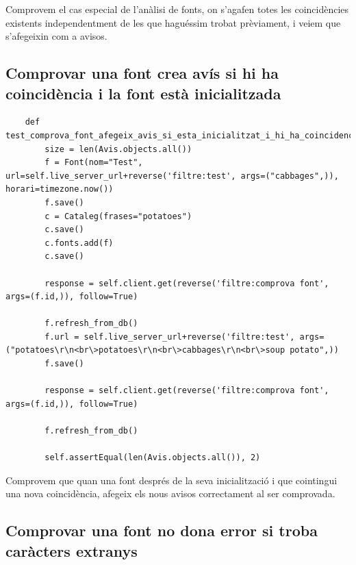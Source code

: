 \documentclass{article}
\begin{document}
Comprovem el cas especial de l'anàlisi de fonts, on s'agafen totes les coincidències existents independentment de les que haguéssim trobat prèviament, i veiem que s'afegeixin com a avisos.

\subsection{Comprovar una font crea avís si hi ha coincidència i la font està inicialitzada}

\begin{lstlisting}
    def test_comprova_font_afegeix_avis_si_esta_inicialitzat_i_hi_ha_coincidencia(self):
        size = len(Avis.objects.all())
        f = Font(nom="Test", url=self.live_server_url+reverse('filtre:test', args=("cabbages",)), horari=timezone.now())
        f.save()
        c = Cataleg(frases="potatoes")
        c.save()
        c.fonts.add(f)
        c.save()

        response = self.client.get(reverse('filtre:comprova font', args=(f.id,)), follow=True)

        f.refresh_from_db()
        f.url = self.live_server_url+reverse('filtre:test', args=("potatoes\r\n<br\>potatoes\r\n<br\>cabbages\r\n<br\>soup potato",))
        f.save()

        response = self.client.get(reverse('filtre:comprova font', args=(f.id,)), follow=True)

        f.refresh_from_db()

        self.assertEqual(len(Avis.objects.all()), 2)
\end{lstlisting}

Comprovem que quan una font després de la seva inicialització i que cointingui una nova coincidència, afegeix els nous avisos correctament al ser comprovada.

\subsection{Comprovar una font no dona error si troba caràcters extranys}
\end{document}

